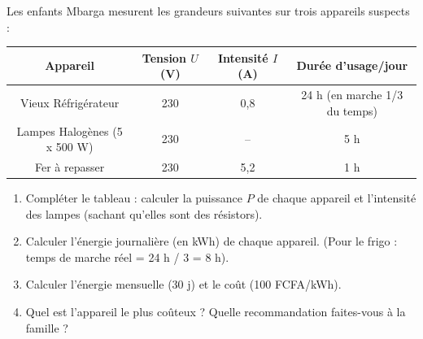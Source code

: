 \documentclass[11pt]{article}
\begin{document}
\begin{exercice}
Les enfants Mbarga mesurent les grandeurs suivantes sur trois appareils suspects :
\begin{center}
\begin{tabular}{|c|c|c|c|}
\hline
\rowcolor{popblueL} \textbf{Appareil} & \textbf{Tension $U$ (V)} & \textbf{Intensité $I$ (A)} & \textbf{Durée d'usage/jour} \\
\hline
Vieux Réfrigérateur & 230 & 0,8 & 24 h (en marche 1/3 du temps) \\
\hline
Lampes Halogènes (5 x 500 W) & 230 & -- & 5 h \\
\hline
Fer à repasser & 230 & 5,2 & 1 h \\
\hline
\end{tabular}
\end{center}
\begin{enumerate}
\item Compléter le tableau : calculer la puissance $P$ de chaque appareil et l'intensité des lampes (sachant qu'elles sont des résistors).
\item Calculer l'énergie journalière (en kWh) de chaque appareil. (Pour le frigo : temps de marche réel = 24 h / 3 = 8 h).
\item Calculer l'énergie mensuelle (30 j) et le coût (100 FCFA/kWh).
\item Quel est l'appareil le plus coûteux ? Quelle recommandation faites-vous à la famille ?
\end{enumerate}
\end{exercice}
\end{document}
